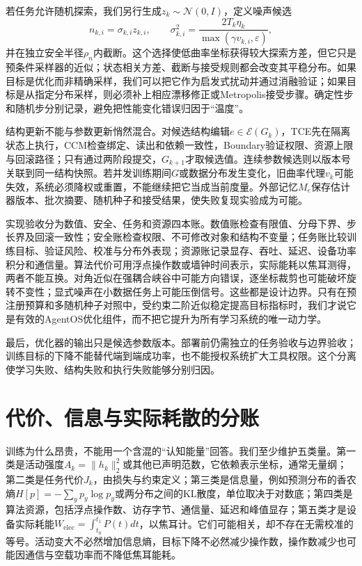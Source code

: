 若任务允许随机探索，我们另行生成$z_k\sim\mathcal N(0,I)$，定义噪声候选
\begin{equation}
n_{k,i}=\sigma_{k,i}z_{k,i},\qquad
\sigma_{k,i}^2=\frac{2T_k\eta_k}{\max(\gamma v_{k,i},\varepsilon)},
\end{equation}
并在独立安全半径$\rho_n$内截断。这个选择使低曲率坐标获得较大探索方差，但它只是预条件采样器的近似；状态相关方差、截断与接受规则都会改变其平稳分布。如果目标是优化而非精确采样，我们可以把它作为启发式扰动并通过消融验证；如果目标是从指定分布采样，则必须补上相应漂移修正或Metropolis接受步骤。确定性步和随机步分别记录，避免把性能变化错误归因于“温度”。

结构更新不能与参数更新悄然混合。对候选结构编辑$e\in\mathcal E(G_k)$，TCE先在隔离状态上执行，CCM检查绑定、读出和依赖一致性，Boundary验证权限、资源上限与回滚路径；只有通过两阶段提交，$G_{k+1}$才取候选值。连续参数候选则以版本号关联到同一结构快照。若并发训练期间$G$或数据分布发生变化，旧曲率代理$v_k$可能失效，系统必须降权或重置，不能继续把它当成当前度量。外部记忆$M_e$保存估计器版本、批次摘要、随机种子和接受结果，使失败复现实验成为可能。

实现验收分为数值、安全、任务和资源四本账。数值账检查有限值、分母下界、步长界及回滚一致性；安全账检查权限、不可修改对象和结构不变量；任务账比较训练目标、验证风险、校准与分布外表现；资源账记录显存、吞吐、延迟、设备功率积分和通信量。算法代价可用浮点操作数或墙钟时间表示，实际能耗以焦耳测得，两者不能互换。对角近似在强耦合峡谷中可能方向错误，逐坐标裁剪也可能破坏旋转不变性；显式噪声在小数据任务上可能压倒信号。这些都是设计边界。只有在预注册预算和多随机种子对照中，受约束二阶近似稳定提高目标指标时，我们才说它是有效的AgentOS优化组件，而不把它提升为所有学习系统的唯一动力学。

最后，优化器的输出只是候选参数版本。部署前仍需独立的任务验收与边界验收；训练目标的下降不能替代端到端成功率，也不能授权系统扩大工具权限。这个分离使学习失败、结构失败和执行失败能够分别归因。

\section{代价、信息与实际耗散的分账}
\label{sec:entropy_minimization}

训练为什么昂贵，不能用一个含混的“认知能量”回答。我们至少维护五类量。第一类是活动强度$A_k=\|h_k\|_2^2$或其他已声明范数，它依赖表示坐标，通常无量纲；第二类是任务代价$J_k$，由损失与约束定义；第三类是信息量，例如预测分布的香农熵$H[p]=-\sum_y p_y\log p_y$或两分布之间的KL散度，单位取决于对数底；第四类是算法资源，包括浮点操作数、访存字节、通信量、延迟和峰值显存；第五类才是设备实际耗能$W_{\mathrm{elec}}=\int_{t_0}^{t_1}P(t)dt$，以焦耳计。它们可能相关，却不存在无需校准的等号。活动变大不必然增加信息熵，目标下降不必然减少操作数，操作数减少也可能因通信与空载功率而不降低焦耳能耗。

